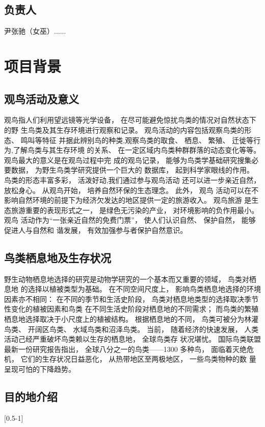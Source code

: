 \documentclass[UTF8,a4paper，12pt]{ctexart}
\begin{document}
\subsection{负责人}
\hspace{3pt} 尹张驰（女巫）......
\section{项目背景}
\subsection{观鸟活动及意义}
观鸟指人们利用望远镜等光学设备， 在尽可能避免惊扰鸟类的情况对自然状态下的野
生鸟类及其生存环境进行观察和记录。 观鸟活动的内容包括观察鸟类的形态、 鸣叫等特征
并据此辨别鸟的种类,观察鸟类的取食、 栖息、 繁殖、 迁徙等行为,了解鸟类与其生存环境
的关系、 在一定区域内鸟类种群群落的动态变化等等。 观鸟最大的意义是在观鸟过程中完
成的观鸟记录， 能够为鸟类学基础研究搜集必要数据， 为野生鸟类学研究提供一个巨大的
数据库， 起到科学家眼线的作用。 鸟类的形态丰富多彩， 活泼好动,我们通过参与观鸟活动
还可以进一步亲近自然， 放松身心。 从观鸟开始， 培养自然环保的生态理念。 此外， 观鸟
活动可以在不影响自然环境的前提下为经济欠发达的地区提供一定的旅游收入。 观鸟旅游
是生态旅游重要的表现形式之一， 是绿色无污染的产业， 对环境影响的负作用最小。 观鸟
活动作为“一张亲近自然的免费门票”， 使人们认识自然、 保护自然， 能够促进人与自然和
谐发展， 有效加强参与者保护自然意识。
\subsection{鸟类栖息地及生存状况}
野生动物栖息地选择的研究是动物学研究的一个基本而又重要的领域， 鸟类对栖息地
的选择以植被类型为基础。 在不同空间尺度上， 影响鸟类栖息地选择的环境因素亦不相同：
在不同的季节和生活史阶段， 鸟类对栖息地类型的选择取决季节性变化的植被因素和鸟类
在不同生活史阶段对栖息地的不同需求； 而鸟类的繁殖栖息地选择取决于小尺度上的植被结构。 根据栖息地的不同， 鸟类可被分为林灌鸟类、 开阔区鸟类、 水域鸟类和沼泽鸟类。
当前， 随着经济的快速发展， 人类活动己经严重破坏鸟类赖以生存的栖息地， 全球鸟类存
状况堪忧。 国际鸟类联盟最新一份研究报告指出， 全球八分之一的鸟类——1300 多种鸟，
面临着灭绝危机， 它们的生存状况日益恶化， 从热带地区至两极地区， 一些鸟类物种的数
量呈现可怕的下降趋势。
\subsection{目的地介绍}
[0.5-1]
\end{document}
